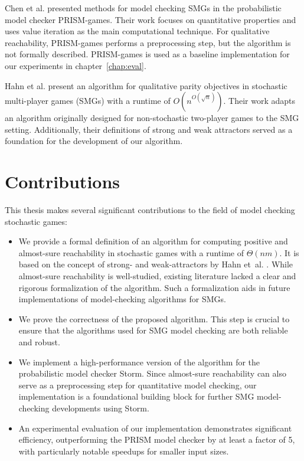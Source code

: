 Chen et al. \cite{chen_automatic_2013, chen_automatic_2013-1} presented methods for model checking SMGs in the probabilistic model checker PRISM-games\cite{lahiri_prism-games_2020}. Their work focuses on quantitative properties and uses value iteration as the main computational technique. For qualitative reachability, PRISM-games performs a preprocessing step, but the algorithm is not formally described. PRISM-games is used as a baseline implementation for our experiments in chapter~\ref{chap:eval}.

Hahn et al. \cite{chaudhuri_simple_2016} present an algorithm for qualitative parity objectives in stochastic multi-player games (SMGs) with a runtime of $O(n^{O(\sqrt{n})})$. Their work adapts an algorithm originally designed for non-stochastic two-player games to the SMG setting. Additionally, their definitions of strong and weak attractors served as a foundation for the development of our algorithm.


\section{Contributions}
This thesis makes several significant contributions to the field of model checking stochastic games:

\begin{itemize}
    \item We provide a formal definition of an algorithm for computing positive and almost-sure reachability in stochastic games with a runtime of $\Theta(nm)$. It is based on the concept of strong- and weak-attractors by Hahn et\ al. \cite{chaudhuri_simple_2016}. While almost-sure reachability is well-studied, existing literature lacked a clear and rigorous formalization of the algorithm. Such a formalization aids in future implementations of model-checking algorithms for SMGs.
    \item We prove the correctness of the proposed algorithm. This step is crucial to ensure that the algorithms used for SMG model checking are both reliable and robust.
    \item We implement a high-performance version of the algorithm for the probabilistic model checker Storm. Since almost-sure reachability can also serve as a preprocessing step for quantitative model checking, our implementation is a foundational building block for further SMG model-checking developments using Storm.
    \item An experimental evaluation of our implementation demonstrates significant efficiency, outperforming the PRISM model checker by at least a factor of 5, with particularly notable speedups for smaller input sizes.
\end{itemize}


